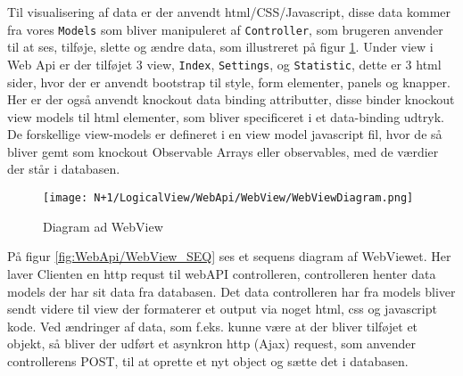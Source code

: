 Til visualisering af data er der anvendt html/CSS/Javascript, disse data kommer fra vores \texttt{Models} som bliver manipuleret af \texttt{Controller}, som brugeren anvender til at ses, tilføje, slette og ændre data, som illustreret på figur \ref{fig:Diagram_WebView}.
\newline
\newline
Under view i Web Api er der tilføjet 3 view, \texttt{Index}, \texttt{Settings}, og \texttt{Statistic}, dette er 3 html sider, hvor der er anvendt bootstrap til style, form elementer, panels og knapper. Her er der også anvendt knockout data binding attributter, disse binder knockout view models til html elementer, som bliver specificeret i et data-binding udtryk. 
\newline
\newline
De forskellige view-models er defineret i en view model javascript fil, hvor de så bliver gemt som knockout Observable Arrays eller observables, med de værdier der står i databasen. 
\newline
\newline
\begin{figure}[H]
	\centering
	\texttt{[image: N+1/LogicalView/WebApi/WebView/WebViewDiagram.png]}
	\caption{Diagram ad WebView}
	\label{fig:Diagram_WebView}
\end{figure}

På figur \ref{fig:WebApi/WebView_SEQ} ses et sequens diagram af WebViewet. Her laver Clienten en http requst til webAPI controlleren, controlleren henter data models der har sit data fra databasen. Det data controlleren har fra models bliver sendt videre til view der formaterer et output via noget html, css og javascript kode. 
\newline
\newline
Ved ændringer af data, som f.eks. kunne være at der bliver tilføjet et objekt, så bliver der udført et asynkron http (Ajax) request, som anvender controllerens POST, til at oprette et nyt object og sætte det i databasen.  

